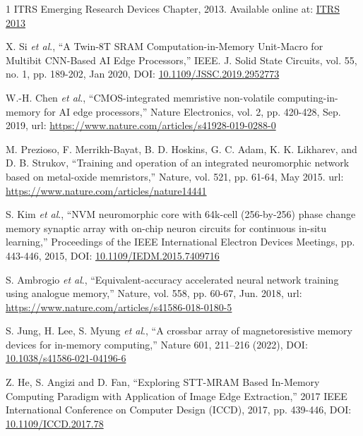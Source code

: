 \documentclass[journal]{IEEEtran}
\begin{document}
\begin{thebibliography}{1}
ITRS Emerging Research Devices Chapter, 2013. Available online at: \href{https://www.semiconductors.org/resources/2013-international-technology-roadmap-for-semiconductors-itrs/}{ITRS 2013}

X. Si \emph{et al}., ``A Twin-8T SRAM Computation-in-Memory Unit-Macro for Multibit CNN-Based AI Edge Processors,” IEEE. J. Solid State Circuits, vol. 55, no. 1, pp. 189-202, Jan 2020, DOI: \href{https://ieeexplore.ieee.org/document/8915834}{10.1109/JSSC.2019.2952773}

W.-H. Chen \emph{et al}., ``CMOS-integrated memristive non-volatile computing-in-memory for AI edge processors,” Nature Electronics, vol. 2, pp. 420-428, Sep. 2019, url: \href{https://www.nature.com/articles/s41928-019-0288-0}{https://www.nature.com/articles/s41928-019-0288-0}

M. Prezioso, F. Merrikh-Bayat, B. D. Hoskins, G. C. Adam, K. K. Likharev, and D. B. Strukov, ``Training and operation of an integrated neuromorphic network based on metal-oxide memristors,” Nature, vol. 521, pp. 61-64, May 2015. url: \href{https://www.nature.com/articles/nature14441}{https://www.nature.com/articles/nature14441}

S. Kim \emph{et al}., ``NVM neuromorphic core with 64k-cell (256-by-256) phase change memory synaptic array with on-chip neuron circuits for continuous in-situ learning,” Proceedings of the IEEE International Electron Devices Meetings, pp. 443-446, 2015, DOI: \href{https://ieeexplore.ieee.org/document/7409716}{10.1109/IEDM.2015.7409716}

S. Ambrogio \emph{et al}., ``Equivalent-accuracy accelerated neural network training using analogue memory,” Nature, vol. 558, pp. 60-67, Jun. 2018, url: \href{https://www.nature.com/articles/s41586-018-0180-5}{https://www.nature.com/articles/s41586-018-0180-5}

S. Jung, H. Lee, S. Myung \emph{et al}., ``A crossbar array of magnetoresistive memory devices for in-memory computing,” Nature 601, 211–216 (2022), DOI: \href{https://doi.org/10.1038/s41586-021-04196-6}{10.1038/s41586-021-04196-6}

Z. He, S. Angizi and D. Fan, ``Exploring STT-MRAM Based In-Memory Computing Paradigm with Application of Image Edge Extraction,” 2017 IEEE International Conference on Computer Design (ICCD), 2017, pp. 439-446, DOI: \href{https://ieeexplore.ieee.org/document/8119251}{10.1109/ICCD.2017.78}


\end{thebibliography}
\end{document}
